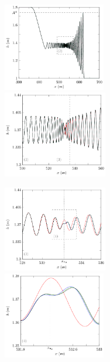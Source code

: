 \documentclass[times]{elsarticle}
\begin{document}
\begin{figure}
	\centering
	\begin{subfigure}{\textwidth}
		\hspace{1mm}
		\includegraphics[width=0.49\textwidth]{Figure-17.pdf}
		\includegraphics[width=0.5\textwidth]{Figure-18.pdf}
	\end{subfigure}
	\begin{subfigure}{\textwidth}
		\includegraphics[width=0.5\textwidth]{Figure-19.pdf}
		\includegraphics[width=0.49\textwidth]{Figure-20.pdf}

\end{subfigure}
\end{figure}
\end{document}
